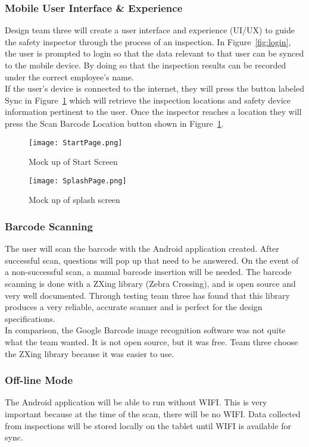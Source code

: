 \documentclass[Letter,11pt]{article}
\begin{document}
	\subsubsection{Mobile User Interface \& Experience}
	Design team three will create a user interface and experience (UI/UX) to guide the safety inspector through the process of an inspection. In Figure~\ref{fig:login}, the user is prompted to login so that the data relevant to that user can be synced to the mobile device. By doing so that the inspection results can be recorded under the correct employee's name. \\
	If the user's device is connected to the internet, they will press the button labeled Sync in Figure~\ref{fig:splash} which will retrieve the inspection locations and safety device information pertinent to the user.
	Once the inspector reaches a location they will press the Scan Barcode Location button shown in Figure~\ref{fig:splash}.
	\begin{figure}[h]

		\begin{minipage}{0.5\textwidth}
			\centering
			\texttt{[image: StartPage.png]}
			\caption{\label{fig:login}Mock up of Start Screen}
		\end{minipage}%
		\begin{minipage}{0.5\textwidth}
			\centering
			\texttt{[image: SplashPage.png]}
			\caption{\label{fig:splash}Mock up of splash screen}
		\end{minipage}
	\end{figure}

	\subsubsection{Barcode Scanning}
	The user will scan the barcode with the Android application created. After successful scan, questions will pop up that need to be answered. On the event of a non-successful scan, a manual barcode insertion will be needed. The barcode scanning is done with a ZXing library (Zebra Crossing), and is open source and very well documented. Through testing team three has found that this library produces a very reliable, accurate scanner and is perfect for the design specifications.\\
	In comparison, the Google Barcode image recognition software was not quite what the team wanted. It is not open source, but it was free. Team three choose the ZXing library because it was easier to use.
	\subsubsection{Off-line Mode}
	The Android application will be able to run without WIFI. This is very important because at the time of the scan, there will be no WIFI. Data collected from inspections will be stored locally on the tablet until WIFI is available for sync. 
\end{document}
